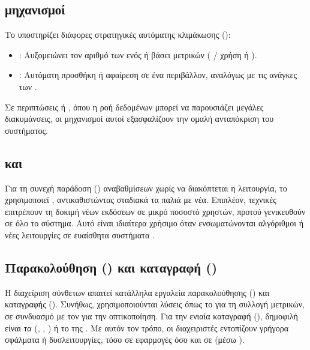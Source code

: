 \subsection{ μηχανισμοί}

Το  υποστηρίζει διάφορες στρατηγικές αυτόματης κλιμάκωσης ():
\begin{itemize}
  \item \textbf{}: Αυξομειώνει τον αριθμό των  ενός  ή  βάσει μετρικών ( /  χρήση ή ).
  \item \textbf{}: Αυτόματη προσθήκη ή αφαίρεση  σε ένα  περιβάλλον, αναλόγως με τις ανάγκες των .
\end{itemize}
Σε περιπτώσεις  ή , όπου η ροή δεδομένων μπορεί να παρουσιάζει μεγάλες διακυμάνσεις, οι μηχανισμοί αυτοί εξασφαλίζουν την ομαλή ανταπόκριση του συστήματος.

\subsection{ και }

Για τη συνεχή παράδοση () αναβαθμίσεων χωρίς να διακόπτεται η λειτουργία, το  χρησιμοποιεί , αντικαθιστώντας σταδιακά τα παλιά  με νέα. Επιπλέον, τεχνικές  επιτρέπουν τη δοκιμή νέων εκδόσεων σε μικρό ποσοστό χρηστών, προτού γενικευθούν σε όλο το σύστημα. Αυτό είναι ιδιαίτερα χρήσιμο όταν ενσωματώνονται αλγόριθμοι  ή νέες λειτουργίες σε ευαίσθητα συστήματα .

\subsection{Παρακολούθηση () και καταγραφή ()}

Η διαχείριση σύνθετων   απαιτεί κατάλληλα εργαλεία παρακολούθησης () και καταγραφής (). Συνήθως, χρησιμοποιούνται λύσεις όπως το  για τη συλλογή μετρικών, σε συνδυασμό με τον  για την οπτικοποίηση. Για την ενιαία καταγραφή (), δημοφιλή είναι τα  (, , ) ή το  της . Με αυτόν τον τρόπο, οι διαχειριστές εντοπίζουν γρήγορα σφάλματα ή δυσλειτουργίες, τόσο σε εφαρμογές  όσο και σε  (μέσω ).

